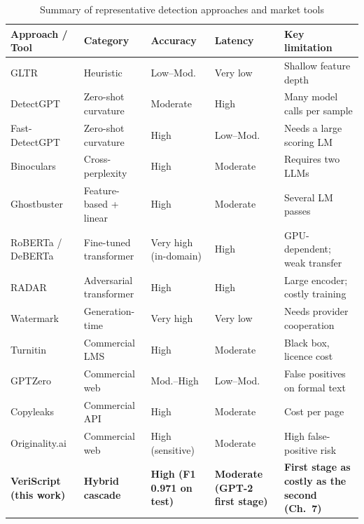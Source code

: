 \begin{table}[H]
\caption{Summary of representative detection approaches and market tools}
\label{tab:lit-summary}
\centering
\small
\begin{tabularx}{\textwidth}{|p{2.9cm}|p{2.3cm}|p{1.65cm}|p{1.65cm}|L|}
\hline
\textbf{Approach / Tool} & \textbf{Category} & \textbf{Accuracy} & \textbf{Latency} & \textbf{Key limitation} \\ \hline
GLTR~\cite{gehrmann2019gltr} & Heuristic & Low--Mod. & Very low & Shallow feature depth \\ \hline
DetectGPT~\cite{mitchell2023detectgpt} & Zero-shot curvature & Moderate & High & Many model calls per sample \\ \hline
Fast-DetectGPT~\cite{bao2024fast} & Zero-shot curvature & High & Low--Mod. & Needs a large scoring LM \\ \hline
Binoculars~\cite{hans2024binoculars} & Cross-perplexity & High & Moderate & Requires two LLMs \\ \hline
Ghostbuster~\cite{verma2024ghostbuster} & Feature-based + linear & High & Moderate & Several LM passes \\ \hline
RoBERTa / DeBERTa~\cite{liu2019roberta,he2023debertav3} & Fine-tuned transformer & Very high (in-domain) & High & GPU-dependent; weak transfer \\ \hline
RADAR~\cite{hu2023radar} & Adversarial transformer & High & High & Large encoder; costly training \\ \hline
Watermark~\cite{kirchenbauer2023watermark} & Generation-time & Very high & Very low & Needs provider cooperation \\ \hline
Turnitin & Commercial LMS & High & Moderate & Black box, licence cost \\ \hline
GPTZero & Commercial web & Mod.--High & Low--Mod. & False positives on formal text \\ \hline
Copyleaks & Commercial API & High & Moderate & Cost per page \\ \hline
Originality.ai & Commercial web & High (sensitive) & Moderate & High false-positive risk \\ \hline
\textbf{VeriScript (this work)} & \textbf{Hybrid cascade} & \textbf{High (F1 0.971 on test)} & \textbf{Moderate (GPT-2 first stage)} & \textbf{First stage as costly as the second (Ch.~7)} \\ \hline
\end{tabularx}
\end{table}

